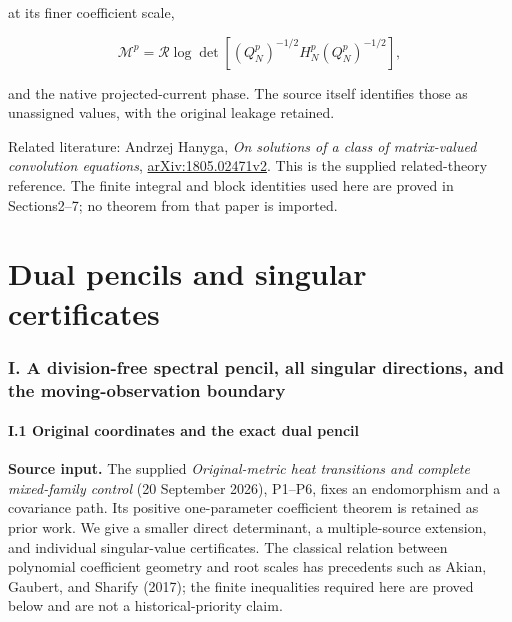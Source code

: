 \documentclass[11pt]{article}
\begin{document}
at its finer coefficient scale,

\[
\mathcal M^p
=
\mathcal R\log\det
\left[(Q_N^p)^{-1/2}H_N^p(Q_N^p)^{-1/2}\right],
\]

and the native projected-current phase. The source itself identifies those as unassigned values, with the original leakage retained.

Related literature: Andrzej Hanyga, \emph{On solutions of a class of matrix-valued convolution equations}, \href{https://arxiv.org/abs/1805.02471v2}{arXiv:1805.02471v2}. This is the supplied related-theory reference. The finite integral and block identities used here are proved in Sections2--7; no theorem from that paper is imported.

\clearpage\part{Dual pencils and singular certificates}
\label{part:9}
\section{I. A division-free spectral pencil, all singular directions, and the moving-observation boundary}\label{i.-a-division-free-spectral-pencil-all-singular-directions-and-the-moving-observation-boundary}

\subsection{I.1 Original coordinates and the exact dual pencil}\label{i.1-original-coordinates-and-the-exact-dual-pencil}

\textbf{Source input.} The supplied \emph{Original-metric heat transitions and complete mixed-family control} (20 September 2026), P1--P6, fixes an endomorphism and a covariance path. Its positive one-parameter coefficient theorem is retained as prior work. We give a smaller direct determinant, a multiple-source extension, and individual singular-value certificates. The classical relation between polynomial coefficient geometry and root scales has precedents such as Akian, Gaubert, and Sharify (2017); the finite inequalities required here are proved below and are not a historical-priority claim.
\end{document}
